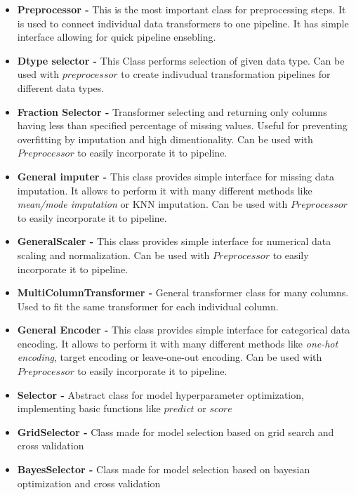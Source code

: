\documentclass[a4paper,twoside,12pt]{book}
\begin{document}
\begin{itemize}
    \item \textbf{Preprocessor -} This is the most important class for preprocessing steps. It is used to connect individual data transformers to one pipeline. It has simple interface allowing for quick pipeline ensebling.
    
    \item \textbf{Dtype selector - } This Class performs selection of given data type. Can be used with $preprocessor$ to create indivudual transformation pipelines for different data types.
    
    \item \textbf{Fraction Selector -}  Transformer selecting and returning only columns having less than specified percentage of missing values. Useful for preventing overfitting by imputation and high dimentionality. Can be used with $Preprocessor$ to easily incorporate it to pipeline.
    
    \item \textbf{General imputer -} This class provides simple interface for missing data imputation. It allows to perform it with many different methods like \emph{mean/mode imputation} or {KNN imputation}. Can be used with $Preprocessor$ to easily incorporate it to pipeline.
    
    \item \textbf{GeneralScaler -}  This class provides simple interface for numerical data scaling and normalization. Can be used with $Preprocessor$ to easily incorporate it to pipeline.
    
    \item \textbf{MultiColumnTransformer -}  General transformer class for many columns. Used to fit the same transformer for each individual column.
    
    \item \textbf{General Encoder -}  This class provides simple interface for categorical data encoding. It allows to perform it with many different methods like \emph{one-hot encoding}, {target encoding} or {leave-one-out encoding}. Can be used with $Preprocessor$ to easily incorporate it to pipeline.
    
    \item \textbf{Selector -}  Abstract class for model hyperparameter optimization, implementing basic functions like $predict$ or $score$
    
    \item \textbf{GridSelector -}  Class made for model selection based on grid search and cross validation
    
    \item \textbf{BayesSelector -}  Class made for model selection based on bayesian optimization and cross validation
\end{itemize}
\end{document}
